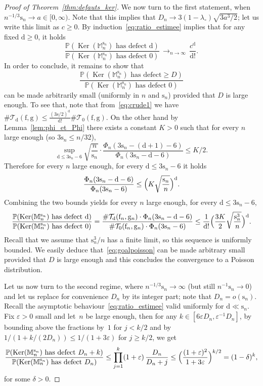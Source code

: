 \documentclass[JEP,XML,SOM,Unicode,NoFloatCountersInSection,NoEqCountersInSection]{cedram}
\theoremstyle{plain}
\theoremstyle{definition}
\theoremstyle{remark}
\renewcommand{\P}{\mathbb{P}}
\newcommand{\Mapb}{\mathbb{M}}
\newcommand{\face}{\mathrm{f}}
\newcommand{\defect}{\mathrm{d}}
\newcommand{\gen}{\mathrm{g}}
\newcommand{\spar}{\mathrm{s}}
\DeclareMathOperator{\Ker}{Ker}
\newcommand{\cv}[1][n]{\,\mathop{\longrightarrow}^{}_{#1 \to \infty}\,}
\begin{document}
\begin{proof}[Proof of Theorem~\ref{thm:defauts_ker}]
We now turn to the first statement, when $n^{-1/3} \spar_n \to a \in [0,\infty)$. Note that this implies that $D_n \to 3 (1-\lambda_{\circ}) \sqrt{3 a^3 / 2}$; let us write this limit as $c \ge 0$.
By induction~\eqref{eq:ratio_estimee} implies that for any fixed $\defect\ge0$, it holds
\[
\frac{\P(\Ker(\Mapb_n^{\spar_n}) \textrm{ has defect } \defect)}{\P(\Ker(\Mapb_n^{\spar_n}) \textrm{ has defect } 0)}
\cv \frac{c^\defect}{\defect!}.
\]
In order to conclude, it remains to show that
\begin{equation}\label{eq:goalpoisson}
\frac{\P(\Ker(\Mapb_n^{\spar_n}) \textrm{ has defect} \geq D)}{\P(\Ker(\Mapb_n^{\spar_n}) \textrm{ has defect } 0)}
\end{equation}
can be made arbitrarily small (uniformly in $n$ and $\mathrm{s}_{n}$) provided that $D$ is large enough. To see that, note that from~\eqref{eq:crude1} we have $\# \mathcal{T}_{\defect}(\face,\gen) \le \frac{(3\spar/2)^\defect}{\defect!} \# \mathcal{T}_{0}(\face,\gen)$.
On the other hand by Lemma~\ref{lem:phi_et_Phi} there exists a constant $K>0$ such that for every $n$ large enough (so \eg $3\spar_n \le n/32$),
\[
\sup_{\defect \le 3\spar_n-6} \sqrt{\frac{n}{\spar_n}} \cdot \frac{\Phi_{n}(3\spar_n-(\defect+1)-6 )}{\Phi_{n}(3\spar_n-\defect-6 )}
\le K/2.
\]
Therefore for every $n$ large enough, for every $\defect \le 3\spar_n-6$ it holds
\[
\frac{\Phi_{n}(3\spar_n-\defect-6 )}{\Phi_{n}(3\spar_n-6 )} \le \Bigl(K \sqrt{\frac{\spar_n}{n}}\Bigr)^\defect.
\]
Combining the two bounds yields for every $n$ large enough, for every $\defect \le 3\spar_n-6$,
\[
\frac{\P(\Ker(\Mapb_n^{\spar_n}) \textrm{ has defect } \defect)}{\P(\Ker(\Mapb_n^{\spar_n}) \textrm{ has defect } 0)}
= \frac{\#\mathcal{T}_\defect(\face_n,\gen_n) \cdot \Phi_{n}(3\spar_n-\defect-6)}{\# \mathcal{T}_0(\face_n,\gen_n) \cdot \Phi_{n}(3\spar_n-6 )}
\le \frac{1}{\defect!} \Bigl(\frac{3K}{2} \sqrt{\frac{\spar_n^3}{n}}\Bigr)^\defect.
\]
Recall that we assume that $\spar_n^3/n$ has a finite limit, so this sequence is uniformly bounded. We easily deduce that~\eqref{eq:goalpoisson} can be made arbitrary small provided that $D$ is large enough and this concludes the convergence to a Poisson distribution.

Let us now turn to the second regime, where $n^{-1/3} \spar_n \to \infty$ (but still $n^{-1} \spar_n \to 0$) and let us replace for convenience $D_n$ by its integer part; note that $D_n = o(\spar_n)$.
Recall the asymptotic behaviour~\eqref{eq:ratio_estimee} valid uniformly for $\defect \ll \spar_n$.
Fix $\varepsilon > 0$ small and let~$n$ be large enough, then for any $k \in [6\varepsilon D_n, \varepsilon^{-1} D_n]$, by bounding above the fractions by~$1$ for $j<k/2$ and by $1/(1+k/(2D_n)) \le 1/(1+3\varepsilon)$ for $j \ge k/2$, we get
\[
\frac{\P(\Ker(\Mapb_n^{\spar_n}) \textrm{ has defect } D_n+k)}{\P(\Ker(\Mapb_n^{\spar_n}) \textrm{ has defect } D_n)}
\le \prod_{j=1}^k (1+\varepsilon)\, \frac{D_n}{D_n+j}
\le \Bigl(\frac{(1+\varepsilon)^2}{1+3\varepsilon}\Bigr)^{k/2}
= (1-\delta)^{k},
\]
for some $\delta >0$.


\end{proof}
\end{document}
